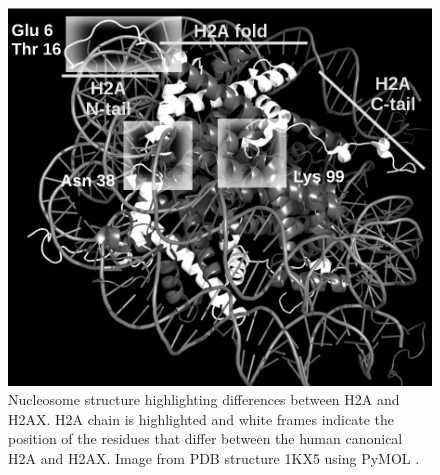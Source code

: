 \documentclass[graybox]{svmult}
\begin{document}
\begin{figure}
\includegraphics{Fig4}
\caption{Nucleosome structure highlighting differences between H2A and H2AX\@. H2A chain is
highlighted and white frames indicate the position of the residues that differ between the human
canonical H2A and H2AX\@. Image from PDB structure 1KX5 using PyMOL \protect\cite{DeL02}.}
\label{fig:H2AInNucleosome}
\end{figure}

\newpage
\end{document}
